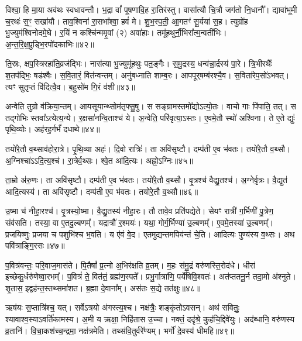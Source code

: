 विश्वा॒ हि मा॒या अव॑थः स्वधावन्तौ। 
भ॒द्रा वां᳚ पूषणावि॒ह रा॒तिर॑स्तु। वासा᳚त्यौ चि॒त्रौ जग॑तो नि॒धानौ᳚। 
द्यावा॑भूमी च॒रथः॑ स॒ꣳ॒ सखा॑यौ। ताव॒श्विना॑ रा॒सभा᳚श्वा॒ हवं॑ मे। 
शु॒भ॒स्प॒ती॒ आ॒गतꣳ॑ सू॒र्यया॑ स॒ह। त्युग्रो॑ह भु॒ज्युम॑श्विनोदमे॒घे। 
र॒यिं न कश्चि॑न्ममृ॒वां (२) अवा॑हाः। तमू॑हथुर्नौ॒भिरा᳚त्म॒न्\-वती॑भिः। 
अ॒न्त॒रि॒क्ष॒प्रुड्भि॒रपो॑दकाभिः॥४२॥


ति॒स्रः, क्षप॒स्त्रिरहा॑ति॒व्रज॑द्भिः। नास॑त्या भु॒ज्युमू॑हथुः पत॒ङ्गैः। 
स॒मु॒द्रस्य॒ धन्व॑न्ना॒र्द्रस्य॑ पा॒रे। त्रि॒भीरथैः᳚ श॒तप॑द्भिः॒ षड॑श्वैः। 
स॒वि॒तारं॒ वित॑न्वन्तम्। अनु॑बध्नाति शाम्ब॒रः। आपपूर्‌षम्ब॑रश्चै॒व। 
स॒विता॑\-रेप॒सो॑\-ऽभवत्। त्यꣳ सुतृप्तं वि॑दित्वै॒व। ब॒हुसो॑म गि॒रं व॑शी॥४३॥

अन्वेति तुग्रो व॑क्रिया॒न्तम्। आयसूयान्थ्सोम॑तृफ्सु॒षु। स सङ्ग्राम\-स्तमो᳚द्योऽत्यो॒तः। 
वाचो गाः पि॑पाति॒ तत्। स तद्गोभिः स्तवा᳚ऽत्येत्य॒न्ये। र॒क्षसा॑नन्वि॒ताश्च॑ ये। 
अ॒न्वेति॒ परि॑वृत्या॒ऽस्तः। ए॒व\-मे॒तौ स्थो॑ अश्विना। 
ते ए॒ते द्युः॑ पृथि॒व्योः। अह॑रह॒र्गर्भं॑ दधाथे॥४४॥

तयो॑रे॒तौ व॒थ्साव॑होरा॒त्रे। पृ॒थि॒व्या अहः॑। दि॒वो रात्रिः॑। 
ता अवि॑सृष्टौ। दम्प॑ती ए॒व भ॑वतः। तयो॑रे॒तौ व॒थ्सौ। 
अ॒ग्निश्चा॑ऽऽदि॒त्य॒श्च॑। रा॒त्रेर्व॒थ्सः। श्वे॒त आ॑दि॒त्यः। अह्नो॒ऽग्निः॥४५॥

ता॒म्रो अ॑रु॒णः। ता अवि॑सृष्टौ। दम्प॑ती ए॒व भ॑वतः। 
तयो॑रे॒तौ व॒थ्सौ। वृ॒त्रश्च॑ वैद्यु॒तश्च॑। अ॒ग्नेर्वृ॒त्रः। वै॒द्युत॑ आदि॒त्यस्य॑। 
ता अवि॑सृष्टौ। दम्प॑ती ए॒व भ॑वतः। तयो॑रे॒तौ व॒थ्सौ॥४६॥


उ॒ष्मा च॑ नीहा॒रश्च॑। वृ॒त्रस्यो॒ष्मा। वै॒द्यु॒तस्य॑ नीहा॒रः। 
तौ तावे॒व प्रति॑पद्येते। सेयꣳ रात्री॑ ग॒र्भिणी॑ पु॒त्रेण॒ संव॑सति। 
तस्या॒ वा ए॒तदु॒ल्बणम्‌᳚। यद्रात्रौ॑ र॒श्मयः॑। 
यथा॒ गोर्ग॒र्भिण्या॑ उ॒ल्बणम्‌᳚। ए॒वमे॒तस्या॑ उ॒ल्बणम्‌᳚। 
प्रजयिष्णुः प्रजया च पशुभि॑श्च भ॒वति। 
य ए॑वं वे॒द। एतमुद्यन्तमपिय॑न्तं चे॒ति। 
आदित्यः पुण्य॑स्य व॒थ्सः। अथ पवि॑त्राङ्गि॒रसः॥४७॥\anuvakamend


प॒वित्र॑वन्तः॒ परि॒वाज॒मास॑ते। पि॒तैषां᳚ प्र॒त्नो अ॒भिर॑क्षति व्र॒तम्। 
म॒हः स॑मु॒द्रं वरु॑णस्ति॒रोद॑धे। धीरा॑ इच्छेकु॒र्धरु॑णेष्वा॒रभम्‌᳚। 
प॒वित्रं॑ ते॒ वित॑तं॒ ब्रह्म॑ण॒स्पते᳚। प्रभु॒र्गात्रा॑णि॒ पर्ये॑षिवि॒श्वतः॑। 
अत॑प्ततनू॒र्न तदा॒मो अ॑श्नुते। शृ॒तास॒ इद्वह॑न्त॒स्तथ्समा॑शत। 
ब्र॒ह्मा दे॒वाना᳚म्। अस॑तः स॒द्ये तत॑क्षुः॥४८॥


ऋष॑यः स॒प्तात्रि॑श्च॒ यत्। सर्वेऽत्रयो अ॑गस्त्य॒श्च। 
नक्ष॑त्रैः॒ शङ्कृ॑तोऽवसन्। अथ॑ सवितुः॒ श्यावाश्व॒स्याऽवर्ति॑कामस्य। 
अ॒मी य ऋक्षा॒ निहि॑तास उ॒च्चा। नक्तं॒ ददृ॑श्रे॒ कुह॑चि॒द्दिवे॑युः। 
अद॑ब्धानि॒ वरु॑णस्य व्र॒तानि॑। वि॒चा॒कश॑च्च॒न्द्रमा॒ नक्ष॑त्रमेति। 
तथ्स॑वि॒तुर्वरे᳚ण्यम्। भर्गो॑ दे॒वस्य॑ धीमहि॥४९॥


